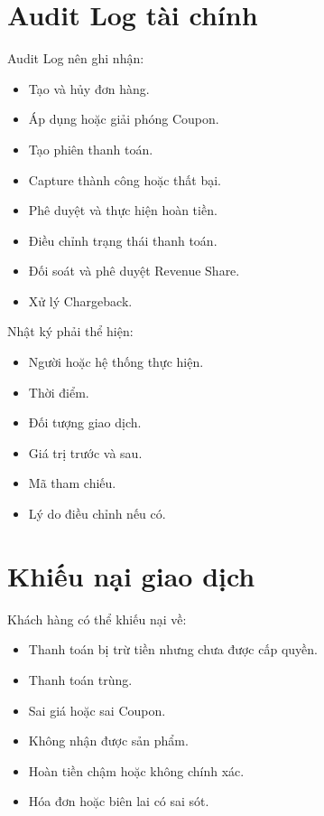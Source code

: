 \documentclass[12pt,a4paper]{article}
\begin{document}
\section{Audit Log tài chính}

Audit Log nên ghi nhận:

\begin{itemize}
    \item Tạo và hủy đơn hàng.
    \item Áp dụng hoặc giải phóng Coupon.
    \item Tạo phiên thanh toán.
    \item Capture thành công hoặc thất bại.
    \item Phê duyệt và thực hiện hoàn tiền.
    \item Điều chỉnh trạng thái thanh toán.
    \item Đối soát và phê duyệt Revenue Share.
    \item Xử lý Chargeback.
\end{itemize}

Nhật ký phải thể hiện:

\begin{itemize}
    \item Người hoặc hệ thống thực hiện.
    \item Thời điểm.
    \item Đối tượng giao dịch.
    \item Giá trị trước và sau.
    \item Mã tham chiếu.
    \item Lý do điều chỉnh nếu có.
\end{itemize}

\section{Khiếu nại giao dịch}

Khách hàng có thể khiếu nại về:

\begin{itemize}
    \item Thanh toán bị trừ tiền nhưng chưa được cấp quyền.
    \item Thanh toán trùng.
    \item Sai giá hoặc sai Coupon.
    \item Không nhận được sản phẩm.
    \item Hoàn tiền chậm hoặc không chính xác.
    \item Hóa đơn hoặc biên lai có sai sót.
\end{itemize}
\end{document}
